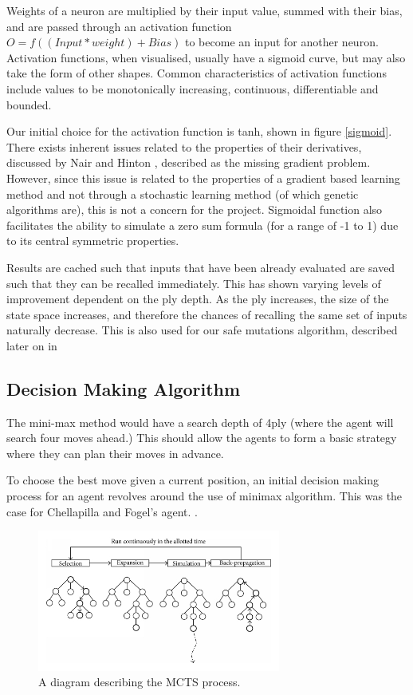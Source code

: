 \documentclass[12pt,a4paper]{article}
\begin{document}
        Weights of a neuron are multiplied by their input value, summed with their bias, and are passed through an activation function $O = f((Input* weight) + Bias)$ to become an input for another neuron. Activation functions, when visualised, usually have a sigmoid curve, but may also take the form of other shapes. Common characteristics of activation functions include values to be monotonically increasing, continuous, differentiable and bounded.

        Our initial choice for the activation function is tanh, shown in figure \ref{sigmoid}. There exists inherent issues related to the properties of their derivatives, discussed by Nair and Hinton \cite{nair_rectified_2010}, described as the missing gradient problem. However, since this issue is related to the properties of a gradient based learning method and not through a stochastic learning method (of which genetic algorithms are), this is not a concern for the project. Sigmoidal function also facilitates the ability to simulate a zero sum formula (for a range of -1 to 1) due to its central symmetric properties.

        Results are cached such that inputs that have been already evaluated are saved such that they can be recalled immediately. This has shown varying levels of improvement dependent on the ply depth. As the ply increases, the size of the state space increases, and therefore the chances of recalling the same set of inputs naturally decrease. This is also used for our safe mutations algorithm, described later on in 
        
    \subsection{Decision Making Algorithm}

        The mini-max method would have a search depth of 4ply (where the agent will search four moves ahead.) This should allow the agents to form a basic strategy where they can plan their moves in advance. 

        To choose the best move given a current position, an initial decision making process for an agent revolves around the use of minimax algorithm. This was the case for Chellapilla and Fogel's agent. \cite{chellapilla_evolving_1999}. 

        \begin{figure}[!h]
            \centering
            \includegraphics[width=80mm]{montecarlo.png}
            \caption{A diagram describing the MCTS process.}
        \end{figure}
\end{document}
